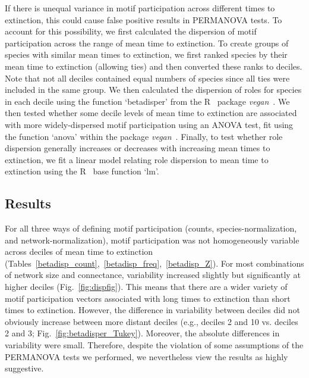 \documentclass[12pt]{article}
\begin{document}
\begin{spacing}{2.0}
        If there is unequal variance in motif participation across different times to extinction, this could cause false positive results in PERMANOVA tests.
        To account for this possibility, we first calculated the dispersion of motif participation across the range of mean time to extinction.
        To create groups of species with similar mean times to extinction, we first ranked species by their mean time to extinction (allowing ties) and then converted these ranks to deciles. 
        Note that not all deciles contained equal numbers of species since all ties were included in the same group.
        We then calculated the dispersion of roles for species in each decile using the function `betadisper' from the R~\citep{R} package \emph{vegan}~\citep{vegan}.
        We then tested whether some decile levels of mean time to extinction are associated with more widely-dispersed motif participation using an ANOVA test, fit using the function `anova' within the package \emph{vegan}~\citep{vegan}.
        Finally, to test whether role dispersion generally increases or decreases with increasing mean times to extinction, we fit a linear model relating role dispersion to mean time to extinction using the R~\citep{R} base function `lm'.


	\subsection*{Results}

        For all three ways of defining motif participation (counts, species-normalization, and network-normalization), motif participation was not homogeneously variable across deciles of mean time to extinction (Tables~\ref{betadisp_count},~\ref{betadisp_freq},~\ref{betadisp_Z}). 
        For most combinations of network size and connectance, variability increased slightly but significantly at higher deciles (Fig.~\ref{fig:dispfig}).
        This means that there are a wider variety of motif participation vectors associated with long times to extinction than short times to extinction.
        However, the difference in variability between deciles did not obviously increase between more distant deciles (e.g., deciles 2 and 10 vs. deciles 2 and 3; Fig.~\ref{fig:betadisper_Tukey}).
        Moreover, the absolute differences in variability were small.
        Therefore, despite the violation of some assumptions of the PERMANOVA tests we performed, we nevertheless view the results as highly suggestive.


\end{spacing}
\end{document}

